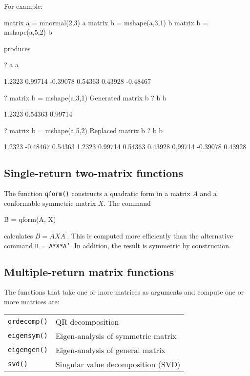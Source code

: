 For example:
\begin{code}
matrix a = mnormal(2,3)
a
matrix b = mshape(a,3,1)
b
matrix b = mshape(a,5,2)
b
\end{code}
produces
\begin{code}
?   a
a

      1.2323      0.99714     -0.39078
     0.54363      0.43928     -0.48467

?   matrix b = mshape(a,3,1)
Generated matrix b
?   b
b

      1.2323
     0.54363
     0.99714

?   matrix b = mshape(a,5,2)
Replaced matrix b
?   b
b

      1.2323     -0.48467
     0.54363       1.2323
     0.99714      0.54363
     0.43928      0.99714
    -0.39078      0.43928
\end{code}

\subsection{Single-return two-matrix functions}
\label{matrix-two}

The function \texttt{qform()} constructs a quadratic form in a matrix
$A$ and a conformable symmetric matrix $X$.  The command
%
\begin{code}
B = qform(A, X)
\end{code}
%
calculates $B = A X A^{\prime}$.  This is computed more efficiently than
the alternative command \texttt{B = A*X*A'}.  In addition, the result
is symmetric by construction.


\subsection{Multiple-return matrix functions}
\label{matrix-multiples}

The functions that take one or more matrices as arguments and compute
one or more matrices are:

\begin{center}
\begin{tabular}{ll}
\texttt{qrdecomp()} & QR decomposition \\
\texttt{eigensym()} & Eigen-analysis of symmetric matrix \\
\texttt{eigengen()} & Eigen-analysis of general matrix \\
\texttt{svd()}      & Singular value decomposition (SVD) 
\end{tabular}
\end{center}

